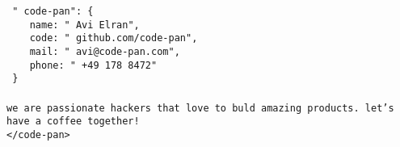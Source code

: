 \documentclass[a5paper,landscape]{article}
\newcommand{\blue}[1]{\texttt{\color{Green} #1}}
\newcommand{\red}[1]{\texttt{\color{WildStrawberry} #1}}
\begin{document}
\noindent
\Huge
\blue{"\red{code-pan}":\ \{}\\
  \blue{\ \ \red{name}:\ "\red{Avi Elran}",} \\
  \blue{\ \ \red{code}:\ "\red{github.com/code-pan}",} \\
  \blue{\ \ \red{mail}:\ "\red{avi@code-pan.com}",} \\
  \blue{\ \ \red{phone}:\ "\red{+49 178 8472}"} \\
\blue{\}}
\clearpage
\pagecolor{MidnightBlue}
\color{White}
\noindent
\texttt{\\<code-pan>\\
  we are passionate hackers that love to buld amazing products. let's have
  a coffee together!\\
  </code-pan>}
\end{document}
